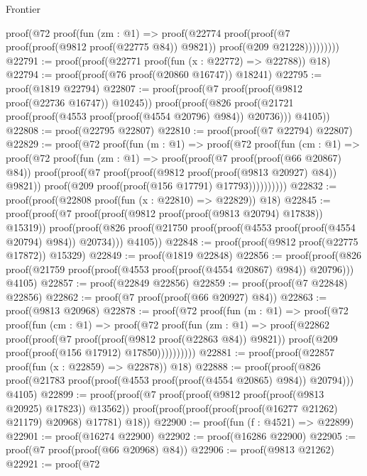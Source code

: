 \begin{lexlean}{Frontier}
\begin{coremodule}
              proof(@72
                  proof(fun (zm : @1) =>
                    proof(@22774
                        proof(proof(@7 proof(proof(@9812 proof(@22775 @84)) @9821))
                            proof(@209 @21228)))))))))
@22791 := proof(proof(@22771 proof(fun (x : @22772) => @22788)) @18)
@22794 := proof(proof(@76 proof(@20860 @16747)) @18241)
@22795 := proof(@1819 @22794)
@22807 := proof(proof(@7 proof(proof(@9812 proof(@22736 @16747)) @10245))
      proof(proof(@826 proof(@21721 proof(proof(@4553 proof(proof(@4554 @20796) @984)) @20736)))
          @4105))
@22808 := proof(@22795 @22807)
@22810 := proof(proof(@7 @22794) @22807)
@22829 := proof(@72
      proof(fun (m : @1) =>
        proof(@72
            proof(fun (cm : @1) =>
              proof(@72
                  proof(fun (zm : @1) =>
                    proof(proof(@7 proof(proof(@66 @20867) @84))
                        proof(proof(@7 proof(proof(@9812 proof(proof(@9813 @20927) @84)) @9821))
                            proof(@209 proof(proof(@156 @17791) @17793))))))))))
@22832 := proof(proof(@22808 proof(fun (x : @22810) => @22829)) @18)
@22845 := proof(proof(@7 proof(proof(@9812 proof(proof(@9813 @20794) @17838)) @15319))
      proof(proof(@826 proof(@21750 proof(proof(@4553 proof(proof(@4554 @20794) @984)) @20734)))
          @4105))
@22848 := proof(proof(@9812 proof(@22775 @17872)) @15329)
@22849 := proof(@1819 @22848)
@22856 := proof(proof(@826 proof(@21759 proof(proof(@4553 proof(proof(@4554 @20867) @984)) @20796)))
      @4105)
@22857 := proof(@22849 @22856)
@22859 := proof(proof(@7 @22848) @22856)
@22862 := proof(@7 proof(proof(@66 @20927) @84))
@22863 := proof(@9813 @20968)
@22878 := proof(@72
      proof(fun (m : @1) =>
        proof(@72
            proof(fun (cm : @1) =>
              proof(@72
                  proof(fun (zm : @1) =>
                    proof(@22862
                        proof(proof(@7 proof(proof(@9812 proof(@22863 @84)) @9821))
                            proof(@209 proof(proof(@156 @17912) @17850))))))))))
@22881 := proof(proof(@22857 proof(fun (x : @22859) => @22878)) @18)
@22888 := proof(proof(@826 proof(@21783 proof(proof(@4553 proof(proof(@4554 @20865) @984)) @20794)))
      @4105)
@22899 := proof(proof(@7 proof(proof(@9812 proof(proof(@9813 @20925) @17823)) @13562))
      proof(proof(proof(proof(proof(@16277 @21262) @21179) @20968) @17781) @18))
@22900 := proof(fun (f : @4521) => @22899)
@22901 := proof(@16274 @22900)
@22902 := proof(@16286 @22900)
@22905 := proof(@7 proof(proof(@66 @20968) @84))
@22906 := proof(@9813 @21262)
@22921 := proof(@72

\end{coremodule}
\end{lexlean}
